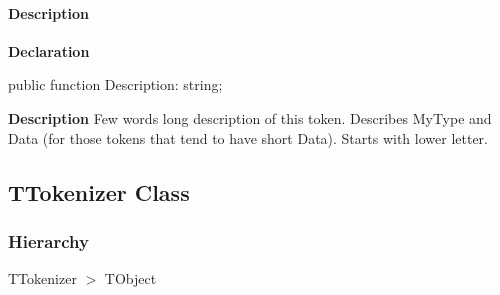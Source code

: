 \documentclass{report}
\newif\ifpdf
\begin{document}
\paragraph*{Description}\hspace*{\fill}

\label{PasDoc_Tokenizer.TToken-Description}
\begin{list}{}{
\setlength{\itemindent}{0cm}
\setlength{\listparindent}{0cm}
\setlength{\leftmargin}{\evensidemargin}
\addtolength{\leftmargin}{\tmplength}
\settowidth{\labelsep}{X}
\addtolength{\leftmargin}{\labelsep}
\setlength{\labelwidth}{\tmplength}
}
\item[\textbf{Declaration}\hfill]
\ifpdf
\begin{flushleft}
\fi
\begin{ttfamily}
public function Description: string;\end{ttfamily}

\ifpdf
\end{flushleft}
\fi

\par
\item[\textbf{Description}]
Few words long description of this token. Describes MyType and Data (for those tokens that tend to have short Data). Starts with lower letter.

\end{list}
\ifpdf
\subsection*{\large{\textbf{TTokenizer Class}}\normalsize\hspace{1ex}\hrulefill}
\else
\subsection*{TTokenizer Class}
\fi
\label{PasDoc_Tokenizer.TTokenizer}
\subsubsection*{\large{\textbf{Hierarchy}}\normalsize\hspace{1ex}\hfill}
TTokenizer {$>$} TObject
\end{document}
